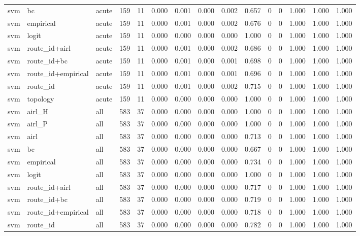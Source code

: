 \begin{tabular}{lllrrrrrrrrrrrr}
svm & bc & acute & 159 & 11 & 0.000 & 0.001 & 0.000 & 0.002 & 0.657 & 0 & 0 & 1.000 & 1.000 & 1.000 \\
svm & empirical & acute & 159 & 11 & 0.000 & 0.001 & 0.000 & 0.002 & 0.676 & 0 & 0 & 1.000 & 1.000 & 1.000 \\
svm & logit & acute & 159 & 11 & 0.000 & 0.000 & 0.000 & 0.000 & 1.000 & 0 & 0 & 1.000 & 1.000 & 1.000 \\
svm & route_id+airl & acute & 159 & 11 & 0.000 & 0.001 & 0.000 & 0.002 & 0.686 & 0 & 0 & 1.000 & 1.000 & 1.000 \\
svm & route_id+bc & acute & 159 & 11 & 0.000 & 0.001 & 0.000 & 0.001 & 0.698 & 0 & 0 & 1.000 & 1.000 & 1.000 \\
svm & route_id+empirical & acute & 159 & 11 & 0.000 & 0.001 & 0.000 & 0.001 & 0.696 & 0 & 0 & 1.000 & 1.000 & 1.000 \\
svm & route_id & acute & 159 & 11 & 0.000 & 0.001 & 0.000 & 0.002 & 0.715 & 0 & 0 & 1.000 & 1.000 & 1.000 \\
svm & topology & acute & 159 & 11 & 0.000 & 0.000 & 0.000 & 0.000 & 1.000 & 0 & 0 & 1.000 & 1.000 & 1.000 \\
svm & airl_H & all & 583 & 37 & 0.000 & 0.000 & 0.000 & 0.000 & 1.000 & 0 & 0 & 1.000 & 1.000 & 1.000 \\
svm & airl_P & all & 583 & 37 & 0.000 & 0.000 & 0.000 & 0.000 & 1.000 & 0 & 0 & 1.000 & 1.000 & 1.000 \\
svm & airl & all & 583 & 37 & 0.000 & 0.000 & 0.000 & 0.000 & 0.713 & 0 & 0 & 1.000 & 1.000 & 1.000 \\
svm & bc & all & 583 & 37 & 0.000 & 0.000 & 0.000 & 0.000 & 0.667 & 0 & 0 & 1.000 & 1.000 & 1.000 \\
svm & empirical & all & 583 & 37 & 0.000 & 0.000 & 0.000 & 0.000 & 0.734 & 0 & 0 & 1.000 & 1.000 & 1.000 \\
svm & logit & all & 583 & 37 & 0.000 & 0.000 & 0.000 & 0.000 & 1.000 & 0 & 0 & 1.000 & 1.000 & 1.000 \\
svm & route_id+airl & all & 583 & 37 & 0.000 & 0.000 & 0.000 & 0.000 & 0.717 & 0 & 0 & 1.000 & 1.000 & 1.000 \\
svm & route_id+bc & all & 583 & 37 & 0.000 & 0.000 & 0.000 & 0.000 & 0.719 & 0 & 0 & 1.000 & 1.000 & 1.000 \\
svm & route_id+empirical & all & 583 & 37 & 0.000 & 0.000 & 0.000 & 0.000 & 0.718 & 0 & 0 & 1.000 & 1.000 & 1.000 \\
svm & route_id & all & 583 & 37 & 0.000 & 0.000 & 0.000 & 0.000 & 0.782 & 0 & 0 & 1.000 & 1.000 & 1.000 \\

\end{tabular}

